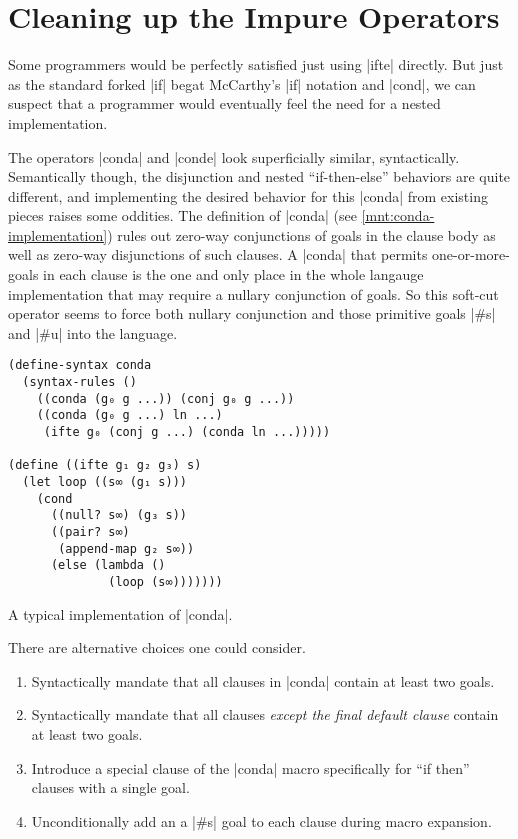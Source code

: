 \documentclass[sigplan,screen,draft,anonymous,review,natbib=false]{acmart}
\begin{document}
\section{Cleaning up the Impure Operators}\label{sec:impure}

Some programmers would be perfectly satisfied just using
\rackinline|ifte| directly. But just as the standard forked
\rackinline|if| begat McCarthy's \rackinline|if| notation and
\rackinline|cond|, we can suspect that a programmer would eventually
feel the need for a nested implementation.

The operators \rackinline|conda| and \rackinline|conde| look
superficially similar, syntactically. Semantically though, the
disjunction and nested \enquote{if-then-else} behaviors are quite
different, and implementing the desired behavior for this
\rackinline|conda| from existing pieces raises some oddities. The
definition of \rackinline|conda| (see \cref{mnt:conda-implementation})
rules out zero-way conjunctions of goals in the clause body as well as
zero-way disjunctions of such clauses. A \rackinline|conda| that
permits one-or-more-goals in each clause is the one and only place in
the whole langauge implementation that may require a nullary
conjunction of goals. So this soft-cut operator seems to force both
nullary conjunction and those primitive goals \rackinline|#s| and
\rackinline|#u| into the language.

\begin{listing}
  \begin{verbatim}
(define-syntax conda
  (syntax-rules ()
    ((conda (g₀ g ...)) (conj g₀ g ...))
    ((conda (g₀ g ...) ln ...)
     (ifte g₀ (conj g ...) (conda ln ...)))))

(define ((ifte g₁ g₂ g₃) s)
  (let loop ((s∞ (g₁ s)))
    (cond
      ((null? s∞) (g₃ s))
      ((pair? s∞)
       (append-map g₂ s∞))
      (else (lambda ()
              (loop (s∞)))))))
  \end{verbatim}
  \caption{A typical implementation of \rackinline|conda|.}
  \label{mnt:conda-implementation}
\end{listing}

There are alternative choices one could consider.

\begin{enumerate}

\item Syntactically mandate that all clauses in \rackinline|conda|
  contain at least two goals.

\item Syntactically mandate that all clauses \emph{except the final
    default clause} contain at least two goals.

\item Introduce a special clause of the \rackinline|conda| macro
  specifically for \enquote{if then} clauses with a single goal.

\item Unconditionally add an a \rackinline|#s| goal to each clause
  during macro expansion.

\end{enumerate}
\end{document}
